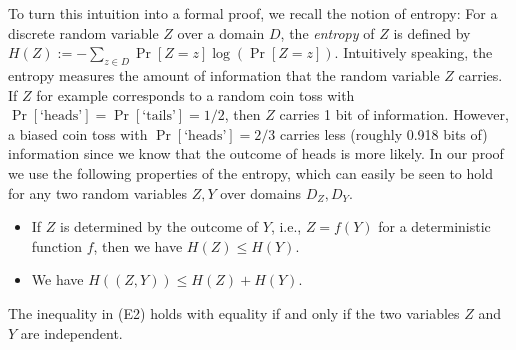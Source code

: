 \documentclass[english,a4paper,11pt]{article}
\begin{document}
{To turn this intuition into a formal proof, we recall the notion of entropy: 
For a discrete random variable $Z$ over a domain $D$, the \emph{entropy} of $Z$ is defined by
$H(Z) := - \sum_{z \in D} \Pr[Z = z] \log(\Pr[Z=z])$. 
Intuitively speaking, the entropy measures the amount of information that the random variable $Z$ carries. 
If $Z$ for example corresponds to a random coin toss with $\Pr[\text{`heads'}] = \Pr[\text{`tails'}] = 1/2$, then $Z$ carries 1 bit of information. 
However, a biased coin toss with $\Pr[\text{`heads'}] = 2/3$ carries less (roughly 0.918 bits of) information since we know that the outcome of heads is more likely.
In our proof we use the following properties of the entropy, which can easily be seen to hold for any two random variables $Z, Y$ over domains $D_Z, D_Y$.
\begin{itemize}
\item[(E1)] If $Z$ is determined by the outcome of $Y$, i.e., $Z = f(Y)$ for a deterministic function $f$, then we have
$H(Z) \le H(Y)$.
\item[(E2)] We have $H((Z, Y)) \le H(Z) + H(Y)$.
\end{itemize}
The inequality in (E2) holds with equality if and only if the two variables $Z$ and $Y$ are independent.

}
\end{document}
